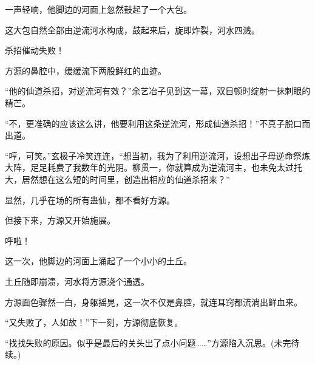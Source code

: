 \begin{this_body}
一声轻响，他脚边的河面上忽然鼓起了一个大包。

这大包自然全部由逆流河水构成，鼓起来后，旋即炸裂，河水四溅。

杀招催动失败！

方源的鼻腔中，缓缓流下两股鲜红的血迹。

“他的仙道杀招，对逆流河有效？”余艺冶子见到这一幕，双目顿时绽射一抹刺眼的精芒。

“不，更准确的应该这么讲，他要利用这条逆流河，形成仙道杀招！”不真子脱口而出道。

“哼，可笑。”玄极子冷笑连连，“想当初，我为了利用逆流河，设想出子母逆命祭炼大阵，足足耗费了我数年的光阴。柳贯一，你就算成为逆流河主，也未免太过托大，居然想在这么短的时间里，创造出相应的仙道杀招来？”

显然，几乎在场的所有蛊仙，都不看好方源。

但接下来，方源又开始施展。

呼啦！

这一次，他脚边的河面上涌起了一个小小的土丘。

土丘随即崩溃，河水将方源浇个通透。

方源面色骤然一白，身躯摇晃，这一次不仅是鼻腔，就连耳窍都流淌出鲜血来。

“又失败了，人如故！”下一刻，方源彻底恢复。

“找找失败的原因。似乎是最后的关头出了点小问题……”方源陷入沉思。(未完待续。)

\end{this_body}


